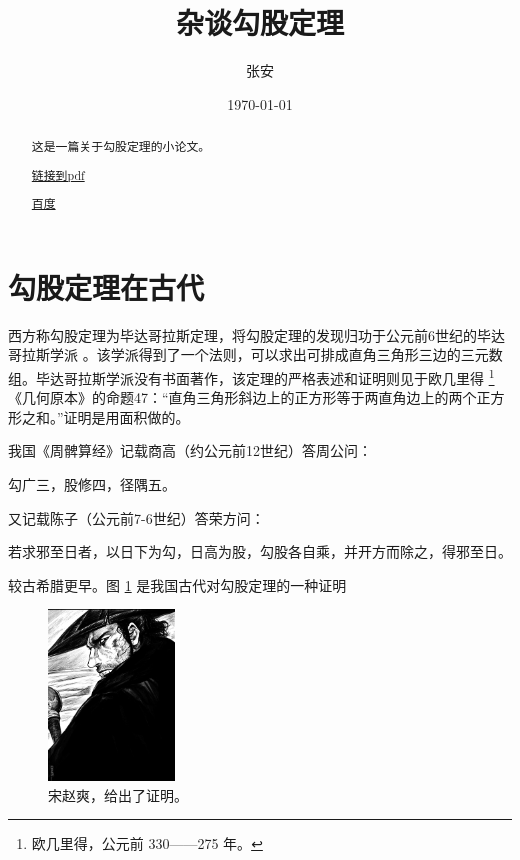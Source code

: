 \documentclass{ctexart}[UTF-8]        %
\begin{document}
\title{杂谈勾股定理}
\author{张安}
\date{\today}
\maketitle


\begin{abstract}
    \small\centering 这是一篇关于勾股定理的小论文。 %

    \href{123/1.pdf}{链接到pdf}

    \href{https://www.baidu.com}{百度}
\end{abstract}

\tableofcontents %


\clearpage
\section{勾股定理在古代} %



\label{sec:ancient}


\small 西方称勾股定理为毕达哥拉斯定理，将勾股定理的发现归功于公元前6世纪的毕达哥拉斯学派 \cite{Kline} 。该学派得到了一个法则，可以求出可排成直角三角形三边的三元数组。毕达哥拉斯学派没有书面著作，该定理的严格表述和证明则见于欧几里得 \footnote{欧几里得，公元前 330——275 年。}《几何原本》的命题47：“直角三角形斜边上的正方形等于两直角边上的两个正方形之和。”证明是用面积做的。



\small 我国《周髀算经》记载商高（约公元前12世纪）答周公问：

\footnotesize\centerline{勾广三，股修四，径隅五。}   %

\small 又记载陈子（公元前7-6世纪）答荣方问：

\footnotesize\centerline{若求邪至日者，以日下为勾，日高为股，勾股各自乘，并开方而除之，得邪至日。}

\small 较古希腊更早。图 \ref{fig:xiantu} 是我国古代对勾股定理的一种证明  %

\begin{figure}[!ht]\centering  %
    \includegraphics[width=0.30\textwidth]{xiantu.jpg}   %
    \caption{宋赵爽，给出了证明。\label{fig:xiantu}}     %
\end{figure}
\end{document}
